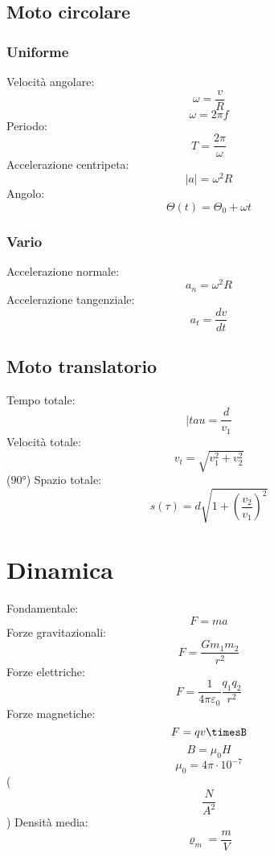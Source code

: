 \documentclass[a4paper,10pt]{book}
\begin{document}
\section{Moto circolare}
\subsection{Uniforme}
Velocità angolare: \[\omega=\frac{v}{R}\]
\[\omega=2\pi f\]
Periodo: \[T=\frac{2\pi}{\omega}\]
Accelerazione centripeta: \[|a|=\omega^2R\]
Angolo: \[\varTheta(t)=\varTheta_0+\omega t\]
\subsection{Vario}
Accelerazione normale: \[a_n=\omega^2R\]
Accelerazione tangenziale: \[a_t=\frac{dv}{dt}\]

\section{Moto translatorio}
Tempo totale: \[|tau=\frac{d}{v_1}\]
Velocità totale: \[v_t=\sqrt{v_1^2+v_2^2}\] (90°)
Spazio totale: \[s(\tau)=d\sqrt{1+(\frac{v_2}{v_1})^2}\]

\chapter{Dinamica}
Fondamentale: \[F=ma\]
Forze gravitazionali: \[F=\frac{Gm_1m_2}{r^2}\]
Forze elettriche: \[F=\frac{1}{4\pi \varepsilon_0}\frac{q_1q_2}{r^2}\]
Forze magnetiche: \[F=qv\timesB\]
\[B=\mu_0H\]
\[\mu_0=4\pi\cdot10^{-7}\] (\[\frac{N}{A^2}\])
Densità media: \[\varrho_m=\frac{m}{V}\]
\end{document}
